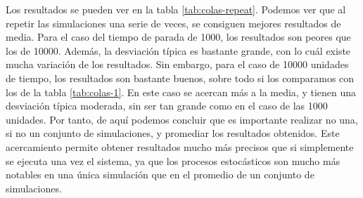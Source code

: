 \documentclass[11pt,a4paper]{article}
\begin{document}
Los resultados se pueden ver en la tabla \ref{tab:colas-repeat}. Podemos ver que al repetir las simulaciones
una serie de veces, se consiguen mejores resultados de media. Para el caso
del tiempo de parada de 1000, los resultados son peores que los de 10000. Además,
la desviación típica es bastante grande, con lo cuál existe mucha variación de los
resultados. Sin embargo, para el caso de 10000 unidades de tiempo, los resultados
son bastante buenos, sobre todo si los comparamos con los de la tabla \ref{tab:colas-1}.
En este caso se acercan más a la media, y tienen una desviación típica moderada, sin ser
tan grande como en el caso de las 1000 unidades. Por tanto, de aquí podemos concluir
que es importante realizar no una, si no un conjunto de simulaciones, y promediar
los resultados obtenidos. Este acercamiento permite obtener resultados mucho
más precisos que si simplemente se ejecuta una vez el sistema, ya que los procesos estocásticos
son mucho más notables en una única simulación que en el promedio de un conjunto de
simulaciones.
\end{document}

